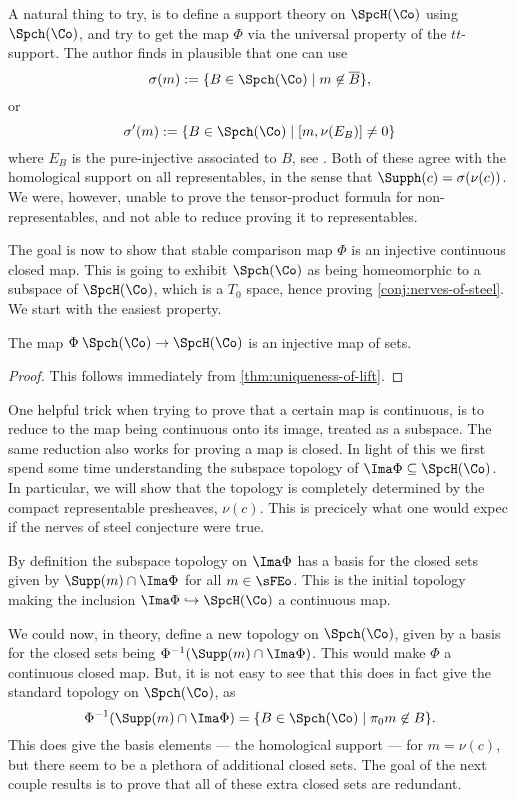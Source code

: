 \begin{remark}
    A natural thing to try, is to define a support theory on $\SpcH(\Co)$ using $\Spch(\Co)$, and try to get the map $\Phi$ via the universal property of the $tt$-support. The author finds in plausible that one can use 
    \[\sigma(m) := \{B\in \Spch(\Co)\mid m \not\in \overline{B}\},\]
    or 
    \[\sigma'(m) := \{B\in \Spch(\Co)\mid [m, \nu(E_B)] \neq 0\}\]
    where $E_B$ is the pure-injective associated to $B$, see \cite{balmer_krause_stevenson_2019}. Both of these agree with the homological support on all representables, in the sense that $\Supph(c) = \sigma(\nu(c))$. We were, however, unable to prove the tensor-product formula for non-representables, and not able to reduce proving it to representables. 
\end{remark}

The goal is now to show that stable comparison map $\Phi$ is an injective continuous closed map. This is going to exhibit $\Spch(\Co)$ as being homeomorphic to a subspace of $\SpcH(\Co)$, which is a $T_0$ space, hence proving \cref{conj:nerves-of-steel}. We start with the easiest property. 

\begin{lemma}
    \label{lm:Phi-is-injective}
    The map $\Phi\: \Spch(\Co)\to \SpcH(\Co)$ is an injective map of sets. 
\end{lemma}
\begin{proof}
    This follows immediately from \cref{thm:uniqueness-of-lift}. 
\end{proof}

One helpful trick when trying to prove that a certain map is continuous, is to reduce to the map being continuous onto its image, treated as a subspace. The same reduction also works for proving a map is closed. In light of this we first spend some time understanding the subspace topology of $\Ima\Phi \subseteq \SpcH(\Co)$. In particular, we will show that the topology is completely determined by the compact representable presheaves, $\nu(c)$. This is precicely what one would expec if the nerves of steel conjecture were true. 

By definition the subspace topology on $\Ima\Phi$ has a basis for the closed sets given by $\Supp(m)\cap \Ima\Phi$ for all $m\in \sFEo$. This is the initial topology making the inclusion $\Ima\Phi \hookrightarrow \SpcH(\Co)$ a continuous map. 

\begin{remark}
    \label{rm:retopologizing-homological-spectrum}
    We could now, in theory, define a new topology on $\Spch(\Co)$, given by a basis for the closed sets being $\Phi^{-1}(\Supp(m)\cap \Ima\Phi)$. This would make $\Phi$ a continuous closed map. But, it is not easy to see that this does in fact give the standard topology on $\Spch(\Co)$, as 
    \[\Phi^{-1}(\Supp(m)\cap \Ima\Phi) = \{B \in \Spch(\Co)\mid \pi_0 m \not\in B\}.\]
    This does give the basis elements --- the homological support --- for $m=\nu(c)$, but there seem to be a plethora of additional closed sets. The goal of the next couple results is to prove that all of these extra closed sets are redundant. 
\end{remark}

